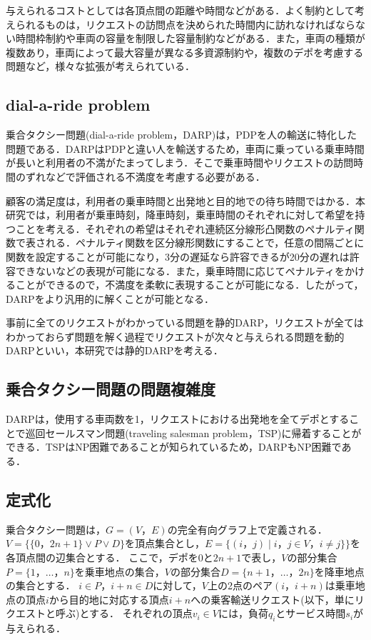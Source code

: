 \documentclass[a4j,11pt,twocolumn]{jsarticle}
\begin{document}
与えられるコストとしては各頂点間の距離や時間などがある．よく制約として考えられるものは，リクエストの訪問点を決められた時間内に訪れなければならない時間枠制約や車両の容量を制限した容量制約などがある．また，車両の種類が複数あり，車両によって最大容量が異なる多資源制約や，複数のデポを考慮する問題など，様々な拡張が考えられている．
\subsection{{\large dial-a-ride problem}}
乗合タクシー問題(dial-a-ride problem，DARP)は，PDPを人の輸送に特化した問題である．DARPはPDPと違い人を輸送するため，車両に乗っている乗車時間が長いと利用者の不満がたまってしまう．そこで乗車時間やリクエストの訪問時間のずれなどで評価される不満度を考慮する必要がある．

顧客の満足度は，利用者の乗車時間と出発地と目的地での待ち時間ではかる．本研究では，利用者が乗車時刻，降車時刻，乗車時間のそれぞれに対して希望を持つことを考える．それぞれの希望はそれぞれ連続区分線形凸関数のペナルティ関数で表される．ペナルティ関数を区分線形関数にすることで，任意の間隔ごとに関数を設定することが可能になり，3分の遅延なら許容できるが20分の遅れは許容できないなどの表現が可能になる．また，乗車時間に応じてペナルティをかけることができるので，不満度を柔軟に表現することが可能になる．したがって，DARPをより汎用的に解くことが可能となる．

事前に全てのリクエストがわかっている問題を静的DARP，リクエストが全てはわかっておらず問題を解く過程でリクエストが次々と与えられる問題を動的DARPといい，本研究では静的DARPを考える．

\subsection{乗合タクシー問題の問題複雑度}
DARPは，使用する車両数を1，リクエストにおける出発地を全てデポとすることで巡回セールスマン問題(traveling salesman problem，TSP)に帰着することができる．TSPはNP困難\cite{TSP}であることが知られているため，DARPもNP困難である．

\subsection{{\large 定式化}}
乗合タクシー問題は，$G = (V，E)$の完全有向グラフ上で定義される．$V =\{\{0，2n+1\} \lor P \lor D\}$を頂点集合とし，$E = \{(i，j) \mid i，j\in V ，i \neq j\}\}$を各頂点間の辺集合とする．
ここで，デポを$0$と$2n+1$で表し，$V$の部分集合$P =\{1，\ldots，n \}$を乗車地点の集合，$V$の部分集合$D =\{n+1，\ldots，2n \}$を降車地点の集合とする．
$i \in P$，$i+n \in D$に対して，$V$上の2点のペア$(i，i+n)$は乗車地点の頂点$i$から目的地に対応する頂点$i+n$への乗客輸送リクエスト(以下，単にリクエストと呼ぶ)とする．
それぞれの頂点$v_i \in V$には，負荷$q_i$とサービス時間$s_i$が与えられる．
\end{document}
